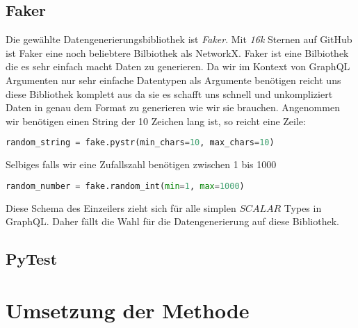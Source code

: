 \subsection{Faker}
Die gewählte Datengenerierungsbibliothek ist \textit{Faker}\cite{fakergithub}.
Mit \textit{16k}\cite{fakergithub} Sternen auf GitHub ist Faker eine noch beliebtere Bilbiothek als NetworkX.
Faker ist eine Bilbiothek die es sehr einfach macht Daten zu generieren.
Da wir im Kontext von GraphQL Argumenten nur sehr einfache Datentypen als Argumente benötigen reicht uns diese
Bibliothek komplett aus da sie es schafft uns schnell und unkompliziert Daten in genau dem Format zu generieren wie wir sie brauchen.
Angenommen wir benötigen einen String der 10 Zeichen lang ist, so reicht eine Zeile:

\begin{lstlisting}[language=Python]
        random_string = fake.pystr(min_chars=10, max_chars=10)
\end{lstlisting}

Selbiges falls wir eine Zufallszahl benötigen zwischen 1 bis 1000

\begin{lstlisting}[language=Python]
        random_number = fake.random_int(min=1, max=1000)
\end{lstlisting}

Diese Schema des Einzeilers zieht sich für alle simplen $SCALAR$ Types in GraphQL.
Daher fällt die Wahl für die Datengenerierung auf diese Bibliothek.







\subsection{PyTest}



\section{Umsetzung der Methode}




